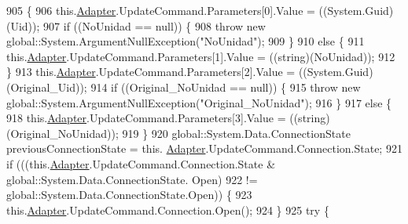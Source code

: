 \begin{DoxyCode}
905                                                                                                            
                   \{
906             this.\hyperlink{class_proyecto___integrador__3_1_1ds_unidad_table_adapters_1_1_unidad_table_adapter_a85041318aa5a0582ef54f4af0d332411}{Adapter}.UpdateCommand.Parameters[0].Value = ((System.Guid)(Uid));
907             \textcolor{keywordflow}{if} ((NoUnidad == null)) \{
908                 \textcolor{keywordflow}{throw} \textcolor{keyword}{new} global::System.ArgumentNullException(\textcolor{stringliteral}{"NoUnidad"});
909             \}
910             \textcolor{keywordflow}{else} \{
911                 this.\hyperlink{class_proyecto___integrador__3_1_1ds_unidad_table_adapters_1_1_unidad_table_adapter_a85041318aa5a0582ef54f4af0d332411}{Adapter}.UpdateCommand.Parameters[1].Value = ((string)(NoUnidad));
912             \}
913             this.\hyperlink{class_proyecto___integrador__3_1_1ds_unidad_table_adapters_1_1_unidad_table_adapter_a85041318aa5a0582ef54f4af0d332411}{Adapter}.UpdateCommand.Parameters[2].Value = ((System.Guid)(Original\_Uid));
914             \textcolor{keywordflow}{if} ((Original\_NoUnidad == null)) \{
915                 \textcolor{keywordflow}{throw} \textcolor{keyword}{new} global::System.ArgumentNullException(\textcolor{stringliteral}{"Original\_NoUnidad"});
916             \}
917             \textcolor{keywordflow}{else} \{
918                 this.\hyperlink{class_proyecto___integrador__3_1_1ds_unidad_table_adapters_1_1_unidad_table_adapter_a85041318aa5a0582ef54f4af0d332411}{Adapter}.UpdateCommand.Parameters[3].Value = ((string)(Original\_NoUnidad));
919             \}
920             global::System.Data.ConnectionState previousConnectionState = this.
      \hyperlink{class_proyecto___integrador__3_1_1ds_unidad_table_adapters_1_1_unidad_table_adapter_a85041318aa5a0582ef54f4af0d332411}{Adapter}.UpdateCommand.Connection.State;
921             \textcolor{keywordflow}{if} (((this.\hyperlink{class_proyecto___integrador__3_1_1ds_unidad_table_adapters_1_1_unidad_table_adapter_a85041318aa5a0582ef54f4af0d332411}{Adapter}.UpdateCommand.Connection.State & global::System.Data.ConnectionState.
      Open) 
922                         != global::System.Data.ConnectionState.Open)) \{
923                 this.\hyperlink{class_proyecto___integrador__3_1_1ds_unidad_table_adapters_1_1_unidad_table_adapter_a85041318aa5a0582ef54f4af0d332411}{Adapter}.UpdateCommand.Connection.Open();
924             \}
925             \textcolor{keywordflow}{try} \{

\end{DoxyCode}
